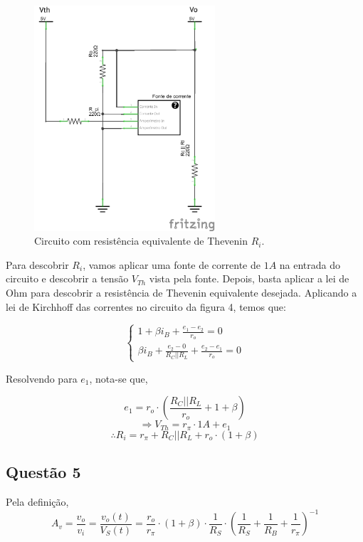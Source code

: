 \documentclass[12pt, a4paper, twoside]{article}
\begin{document}
\begin{figure}[H]
    \centering
    \includegraphics[width=0.6\textwidth]{figs/rel6/ex4i.png}
    \caption{Circuito com resistência equivalente de Thevenin $R_i$.}
\end{figure}

Para descobrir $R_i$, vamos aplicar uma fonte de corrente de $1A$ na entrada do circuito e descobrir a tensão $V_{Th}$ vista pela fonte. Depois, basta aplicar a lei de Ohm para descobrir a resistência de Thevenin equivalente desejada. Aplicando a lei de Kirchhoff das correntes no circuito da figura 4, temos que:

\begin{equation}
    \begin{cases}
        1 + \beta i_B + \frac{e_1 - e_2}{r_o} = 0 \\
        \beta i_B + \frac{e_2 - 0}{R_C || R_L} + \frac{e_2 - e_1}{r_o} = 0
    \end{cases}
\end{equation}

Resolvendo para $e_1$, nota-se que,

$$ e_1 = r_o \cdot \left( \frac{R_C || R_L}{r_o} + 1 + \beta \right) $$
$$ \Rightarrow V_{Th} = r_\pi \cdot 1A + e_1 $$
$$ \therefore R_i = r_\pi + R_C || R_L + r_o \cdot (1 + \beta) $$

\subsection{Questão 5}

Pela definição,
$$ A_v = \frac{v_o}{v_i} = \frac{v_o(t)}{V_S(t)} = \frac{r_o}{r_\pi} \cdot (1+\beta) \cdot \frac{1}{R_S} \cdot \left(\frac{1}{R_S} + \frac{1}{R_B} + \frac{1}{r_\pi} \right)^{-1} $$
\end{document}

